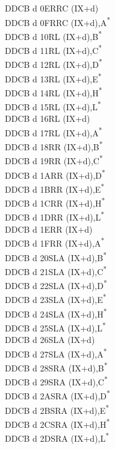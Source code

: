 \documentclass[twoside,openright,a4paper]{book}
\begin{document}
\begin{multicols}{3}
{\begin{tabbing}
	DDCB d 0E\>RRC (IX+d)\\
	DDCB d 0F\>RRC (IX+d),A\textsuperscript{*}\\
	DDCB d 10\>RL (IX+d),B\textsuperscript{*}\\
	DDCB d 11\>RL (IX+d),C\textsuperscript{*}\\
	DDCB d 12\>RL (IX+d),D\textsuperscript{*}\\
	DDCB d 13\>RL (IX+d),E\textsuperscript{*}\\
	DDCB d 14\>RL (IX+d),H\textsuperscript{*}\\
	DDCB d 15\>RL (IX+d),L\textsuperscript{*}\\
	DDCB d 16\>RL (IX+d)\\
	DDCB d 17\>RL (IX+d),A\textsuperscript{*}\\
	DDCB d 18\>RR (IX+d),B\textsuperscript{*}\\
	DDCB d 19\>RR (IX+d),C\textsuperscript{*}\\
	DDCB d 1A\>RR (IX+d),D\textsuperscript{*}\\
	DDCB d 1B\>RR (IX+d),E\textsuperscript{*}\\
	DDCB d 1C\>RR (IX+d),H\textsuperscript{*}\\
	DDCB d 1D\>RR (IX+d),L\textsuperscript{*}\\
	DDCB d 1E\>RR (IX+d)\\
	DDCB d 1F\>RR (IX+d),A\textsuperscript{*}\\
	DDCB d 20\>SLA (IX+d),B\textsuperscript{*}\\
	DDCB d 21\>SLA (IX+d),C\textsuperscript{*}\\
	DDCB d 22\>SLA (IX+d),D\textsuperscript{*}\\
	DDCB d 23\>SLA (IX+d),E\textsuperscript{*}\\
	DDCB d 24\>SLA (IX+d),H\textsuperscript{*}\\
	DDCB d 25\>SLA (IX+d),L\textsuperscript{*}\\
	DDCB d 26\>SLA (IX+d)\\
	DDCB d 27\>SLA (IX+d),A\textsuperscript{*}\\
	DDCB d 28\>SRA (IX+d),B\textsuperscript{*}\\
	DDCB d 29\>SRA (IX+d),C\textsuperscript{*}\\
	DDCB d 2A\>SRA (IX+d),D\textsuperscript{*}\\
	DDCB d 2B\>SRA (IX+d),E\textsuperscript{*}\\
	DDCB d 2C\>SRA (IX+d),H\textsuperscript{*}\\
	DDCB d 2D\>SRA (IX+d),L\textsuperscript{*}\\

\end{tabbing}}
\end{multicols}
\end{document}
